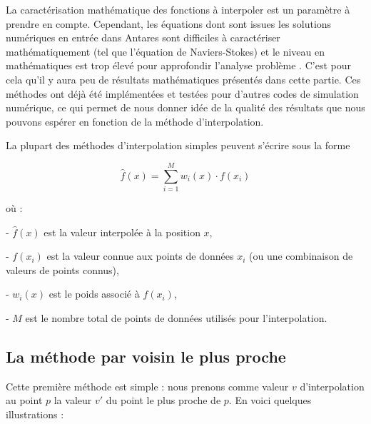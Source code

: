 La caractérisation mathématique des fonctions à interpoler est un paramètre à prendre en compte. Cependant, les équations dont sont issues les solutions numériques en entrée dans Antares sont difficiles à caractériser mathématiquement (tel que l'équation de Naviers-Stokes) et le niveau en mathématiques est trop élevé pour approfondir l'analyse problème \cite{gordont1971_2}. C'est pour cela qu'il y aura peu de résultats mathématiques présentés dans cette partie.
Ces méthodes ont déjà été implémentées et testées pour d'autres codes de simulation numérique, ce qui permet de nous donner idée de la qualité des résultats que nous pouvons espérer en fonction de la méthode d'interpolation.


La plupart des méthodes d'interpolation simples peuvent s'écrire sous la forme

\begin{equation}
    \hat{f}(x) = \sum_{i=1}^{M} w_i(x) \cdot f(x_i)
\end{equation}

où :

- \(\hat{f}(x)\) est la valeur interpolée à la position \(x\),

\vspace{-0,2cm}

- \(f(x_i)\) est la valeur connue aux points de données \(x_i\) (ou une combinaison de valeurs de points connus),

\vspace{-0,2cm}

- \(w_i(x)\) est le poids associé à \(f(x_i)\),

\vspace{-0,2cm}

- \(M\) est le nombre total de points de données utilisés pour l'interpolation.




\subsection{La méthode par voisin le plus proche}
Cette première méthode est simple : nous prenons comme valeur \( v \) d'interpolation au point \( p \) la valeur \( v' \) du point le plus proche de \( p \).
En voici quelques illustrations :


